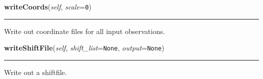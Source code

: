    \label{multireg:imageshift:ImageShift:writeCoords}
    \vspace{0.5ex}

    \begin{boxedminipage}{\textwidth}

    \raggedright \textbf{writeCoords}(\textit{self}, \textit{scale}=\texttt{0\-})

    \vspace{-1.5ex}

    \rule{\textwidth}{0.5\fboxrule}
    Write out coordinate files for all input observations.

    \vspace{1ex}

    \end{boxedminipage}

    \label{multireg:imageshift:ImageShift:writeShiftFile}
    \vspace{0.5ex}

    \begin{boxedminipage}{\textwidth}

    \raggedright \textbf{writeShiftFile}(\textit{self}, \textit{shift\_list}=\texttt{N\-o\-n\-e\-}, \textit{output}=\texttt{N\-o\-n\-e\-})

    \vspace{-1.5ex}

    \rule{\textwidth}{0.5\fboxrule}
    Write out a shiftfile.

    \vspace{1ex}

    \end{boxedminipage}


